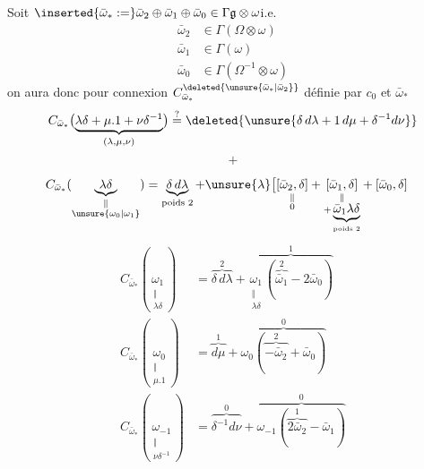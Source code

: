 Soit $\inserted{\bar\omega_*:=}\bar\omega_2\oplus\bar\omega_1\oplus\bar\omega_0
\in\Gamma\mathfrak g\otimes\omega$\quad i.e.
\[
\begin{aligned}
\bar\omega_2&\in\Gamma(\Omega\otimes\omega)\\
\bar\omega_1&\in\Gamma(\omega)\\
\bar\omega_0&\in\Gamma(\Omega^{-1}\otimes\omega)
\end{aligned}
\]
on aura donc pour connexion $C^{\deleted{\unsure{\bar\omega_*|\bar\omega_2}}}_{\bar\omega_*}$
définie par $c_0$ et $\bar\omega_*$
\[
C_{\bar\omega_*}\bigl(\underbrace{\lambda\delta+\mu.1+\nu\delta^{-1}}_{(\lambda,\mu,\nu)}\bigr)
\overset{?}{=}\deleted{\unsure{\delta\,d\lambda+1\,d\mu+\delta^{-1}d\nu}}
\]
\[
+
\]

\[
\begin{aligned}
C_{\bar\omega_*}(\underset{\substack{\Vert\\\unsure{\omega_0|\omega_1}}}{\underbrace{\lambda\delta}})
&=\underbrace{\delta\,d\lambda}_{\text{poids }2}+\unsure{\lambda}
\bigl[\underset{\substack{\Vert\\0}}{[\bar\omega_2,\delta]}
+\underset{\substack{\Vert\\+\underbrace{\bar\omega_1\lambda\delta}_{\text{poids }2}}}{[\bar\omega_1,\delta]}
+[\bar\omega_0,\delta]
\end{aligned}
\]
\margin{$\deleted{\unsure{+|-}}\underbrace{2\bar\omega_0\lambda\delta}$}
\[
\begin{aligned}
C_{\bar\omega_*}(\underset{\substack{\Vert\\\lambda\delta}}{\omega_1})
&=\overbrace{\delta\,d\lambda}^{2}
+\overbrace{\underset{\substack{\Vert\\\lambda\delta}}{\omega_1}
(\overbrace{\bar\omega_1}^{2}-2\bar\omega_0)}^{1}\\
C_{\bar\omega_*}(\underset{\substack{\Vert\\\mu.1}}{\omega_0})
&=\overbrace{d\mu}^{1}
+\overbrace{\omega_0(\overbrace{-\bar\omega_2}^{2}+\bar\omega_0)}^{0}\\
C_{\bar\omega_*}(\underset{\substack{\Vert\\\nu\delta^{-1}}}{\omega_{-1}})
&=\overbrace{\delta^{-1}d\nu}^{0}
+\overbrace{\omega_{-1}(\overbrace{2\bar\omega_2}^{1}-\bar\omega_1)}^{0}
\end{aligned}
\]


